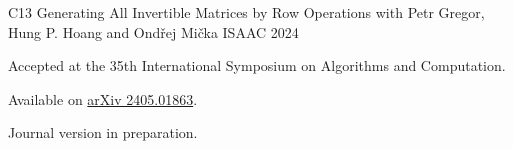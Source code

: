 \begin{cvpublications}
  \cvpublication
  {C13} %
  {Generating All Invertible Matrices by Row Operations} %
  {with Petr Gregor, Hung P. Hoang and Ondřej Mička} %
  {ISAAC} %
  {2024}
  {
  \begin{cvitems} %
    \item Accepted at the 35th International Symposium on Algorithms and Computation.
    \item[] Available on \href{https://arxiv.org/abs/2405.01863}{arXiv 2405.01863}.
    \item Journal version in preparation.
  \end{cvitems}
  }
\end{cvpublications}
  
\vspace{2 mm}
\vspace{2 mm}

